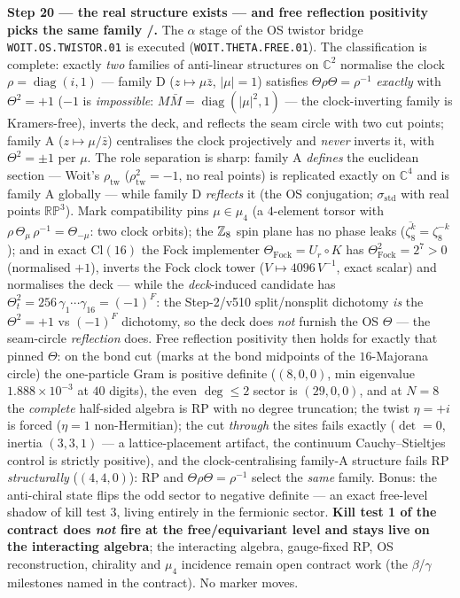 \par\smallskip\noindent\textbf{Step 20 --- the real structure exists --- and free reflection
positivity picks the same family \mE/\mO.} The $\alpha$ stage of the OS twistor bridge
\texttt{WOIT.OS.TWISTOR.01} is executed (\texttt{WOIT.THETA.FREE.01}). The classification is
complete: exactly \emph{two} families of anti-linear structures on $\mathbb C^2$ normalise the clock
$\rho=\operatorname{diag}(i,1)$ --- family D ($z\mapsto\mu\bar z$, $|\mu|=1$) satisfies
$\Theta\rho\Theta=\rho^{-1}$ \emph{exactly} with $\Theta^2=+1$ ($-1$ is \emph{impossible}:
$M\bar M=\operatorname{diag}(|\mu|^2,1)$ --- the clock-inverting family is Kramers-free), inverts
the deck, and reflects the seam circle with two cut points; family A ($z\mapsto\mu/\bar z$)
centralises the clock projectively and \emph{never} inverts it, with $\Theta^2=\pm1$ per $\mu$.
The role separation is sharp: family A \emph{defines} the euclidean section --- Woit's
$\rho_{\mathrm{tw}}$ ($\rho_{\mathrm{tw}}^2=-1$, no real points) is replicated exactly on $\mathbb C^4$
and is family A globally --- while family D \emph{reflects} it (the OS conjugation;
$\sigma_{\mathrm{std}}$ with real points $\mathbb{RP}^3$). Mark compatibility pins
$\mu\in\mu_4$ (a $4$-element torsor with $\rho\,\Theta_\mu\,\rho^{-1}=\Theta_{-\mu}$: two clock
orbits); the $\mathbb{Z}_8$ spin plane has no phase leaks ($\overline{\zeta_8^k}=\zeta_8^{-k}$); and in
exact $\mathrm{Cl}(16)$ the Fock implementer $\Theta_{\mathrm{Fock}}=U_r\circ K$ has
$\Theta_{\mathrm{Fock}}^2=2^7>0$ (normalised $+1$), inverts the Fock clock tower
($V\mapsto4096\,V^{-1}$, exact scalar) and normalises the deck --- while the \emph{deck}-induced
candidate has $\Theta_t^2=256\,\gamma_1\cdots\gamma_{16}=(-1)^F$: the Step-2/v510 split/nonsplit
dichotomy \emph{is} the $\Theta^2=+1$ vs $(-1)^F$ dichotomy, so the deck does \emph{not} furnish
the OS $\Theta$ --- the seam-circle \emph{reflection} does. Free reflection positivity then holds
for exactly that pinned $\Theta$: on the bond cut (marks at the bond midpoints of the
$16$-Majorana circle) the one-particle Gram is positive definite ($(8,0,0)$, min eigenvalue
$1.888\times10^{-3}$ at $40$ digits), the even $\deg\le2$ sector is $(29,0,0)$, and at $N=8$ the
\emph{complete} half-sided algebra is RP with no degree truncation; the twist $\eta=+i$ is forced
($\eta=1$ non-Hermitian); the cut \emph{through} the sites fails exactly ($\det=0$, inertia
$(3,3,1)$ --- a lattice-placement artifact, the continuum Cauchy--Stieltjes control is strictly
positive), and the clock-centralising family-A structure fails RP \emph{structurally}
($(4,4,0)$): RP and $\Theta\rho\Theta=\rho^{-1}$ select the \emph{same} family. Bonus: the
anti-chiral state flips the odd sector to negative definite --- an exact free-level shadow of
kill test 3, living entirely in the fermionic sector. \textbf{Kill test 1 of the contract does
\emph{not} fire at the free/equivariant level and stays live on the interacting algebra}; the
interacting algebra, gauge-fixed RP, OS reconstruction, chirality and $\mu_4$ incidence remain
open contract work (the $\beta$/$\gamma$ milestones named in the contract). No marker moves.

